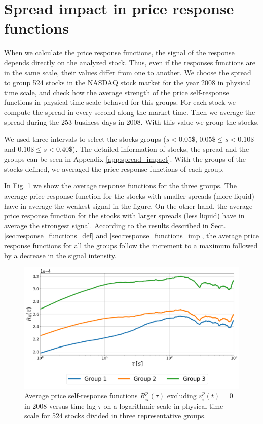 \section{Spread impact in price response functions}\label{sec:spread_impact}

When we calculate the price response functions, the signal of the response
depends directly on the analyzed stock. Thus, even if the responses functions
are in the same scale, their values differ from one to another. We choose the
spread \cite{reg_and_irreg} to group 524 stocks in the NASDAQ stock market for
the year 2008 in physical time scale, and check how the average strength of the
price self-response functions in physical time scale behaved for this groups.
For each stock we compute the spread in every second along the market time.
Then we average the spread during the 253 business days in 2008. With this
value we group the stocks.

We used three intervals to select the stocks groups ($s<0.05\$$,
$0.05\$ \le s <0.10\$$ and $0.10\$ \le s <0.40\$$). The detailed information of
stocks, the spread and the groups can be seen in Appendix
\ref{app:spread_impact}. With the groups of the stocks defined, we averaged the
price response functions of each group.

In Fig. \ref{fig:spread_impact} we show the average response functions for
the three groups. The average price response function for the stocks with
smaller spreads (more liquid) have in average the weakest signal in the figure.
On the other hand, the average price response function for the stocks with
larger spreads (less liquid) have in average the strongest signal. According to
the results described in Sect. \ref{sec:response_functions_def} and
\ref{sec:response_functions_imp}, the average price response functions for all
the groups follow the increment to a maximum followed by a decrease in the
signal intensity.

\begin{figure}[htbp]
    \centering
    \includegraphics[width=\columnwidth]{figures/06_spread_impact_2008.png}
    \caption{Average price self-response functions
             $R^{p}_{ii}\left(\tau\right)$ excluding
             $\varepsilon^{p}_{i}\left(t\right) = 0$ in 2008 versus time lag
             $\tau$ on a logarithmic scale in physical time scale for 524
             stocks divided in three representative groups.}
    \label{fig:spread_impact}
\end{figure}

